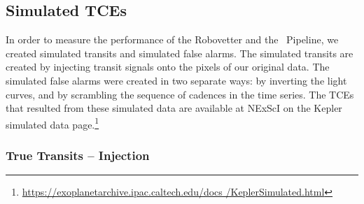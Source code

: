 \subsection{Simulated TCEs}
\label{s:simulated}
In order to measure the performance of the Robovetter and the \Kepler\ Pipeline, we created simulated transits and simulated false alarms. The simulated transits are created by injecting transit signals onto the pixels of our original data. The simulated false alarms were created in two separate ways: by inverting the light curves, and by scrambling the sequence of cadences in the time series. The TCEs that resulted from these simulated data are available at NExScI on the Kepler simulated data page.\footnote{\url{https://exoplanetarchive.ipac.caltech.edu/docs /KeplerSimulated.html}}


\subsubsection{True Transits -- Injection}
\label{injectsec}

